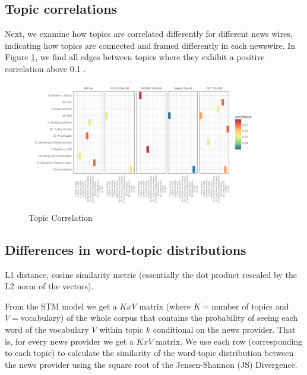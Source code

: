 \documentclass[12pt,a4paper,notitlepage]{article}
\begin{document}
\subsection{Topic correlations}

Next, we examine how topics are correlated differently for different news wires, indicating how topics are connected and framed differently in each newswire. In Figure \ref{fig_topic_correlations}, we find all edges between topics where they exhibit a positive correlation above 0.1 \citep{roberts_model_2016}.


\begin{figure}[H]
	\caption{Topic Correlation}
		\begin{center}
			\includegraphics[width=0.9\textwidth,keepaspectratio]{../figs/topic_correlation.png}
		\end{center}
	\label{fig_topic_correlations}
\end{figure}


\subsection{Differences in word-topic distributions}\label{ch_similarity}

L1 distance, cosine similarity metric (essentially the dot product rescaled by the L2 norm of the vectors).

From the STM model we get a $KxV$ matrix (where $K=$number of topics and $V=$vocabulary) of the whole corpus that contains the probability of seeing each word of the vocabulary $V$ within topic $k$ conditional on the news provider. That is, for every news provider we get a $KxV$ matrix. We use each row (corresponding to each topic) to calculate the similarity of the word-topic distribution between the news provider using the square root of the Jensen-Shannon (JS) Divergence.
\end{document}
